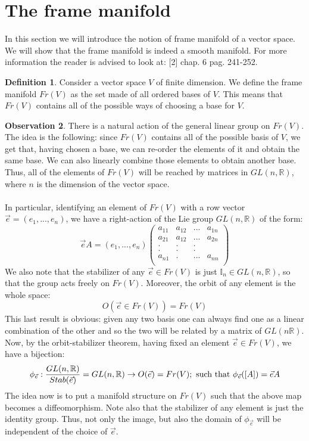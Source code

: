 \documentclass[12pt,a4paper]{report}
\theoremstyle{definition}
\newtheorem{Def}{Definition}[chapter]
\theoremstyle{Theorem}
\theoremstyle{definition}
\theoremstyle{definition}
\newtheorem{Obs}[Def]{Observation}
\begin{document}
	\section{The frame manifold}
	In this section we will introduce the notion of frame manifold of a vector space. We will show that the frame manifold is indeed a smooth manifold. For more information the reader is advised to look at: [2] chap. 6 pag. 241-252.
	\begin{Def}\label{Def_6.5}
		Consider a vector space $V$ of finite dimension. We define the frame manifold $Fr(V)$ as the set made of all ordered bases of $V$. This means that $Fr(V)$ contains all of the possible ways of choosing a base for $V$.
	\end{Def}
	\begin{Obs}
		There is a natural action of the general linear group on $Fr(V)$. The idea is the following: since $Fr(V)$ contains all of the possible basis of $V$, we get that, having chosen a base, we can re-order the elements of it and obtain the same base. We can also linearly combine those elements to obtain another base. Thus, all of the elements of $Fr(V)$ will be reached by matrices in $GL(n,\mathbb{R})$, where $n$ is the dimension of the vector space.\\
		\\
		In particular, identifying an element of $Fr(V)$ with a row vector $\vec{e}=(e_1,...,e_n)$, we have a right-action of the Lie group $GL(n,\mathbb{R})$ of the form:
		$$\vec{e}A=(e_1,...,e_n)\begin{pmatrix}
			a_{11}&a_{12}&...&a_{1n}\\
			a_{21}&a_{12}&...&a_{2n}\\
			.     &.     &.   &     \\
			.     &.     &.   &     \\
			a_{n1}&.     &...&a_{nn}\\
		\end{pmatrix}$$
		We also note that the stabilizer of any $\vec{e}\in Fr(V)$ is just $\mathbb{I}_n\in GL(n,\mathbb{R})$, so that the group acts freely on $Fr(V)$. Moreover, the orbit of any element is the whole space: 
		$$O(\vec{e}\in Fr(V))=Fr(V)$$
		This last result is obvious: given any two basis one can always find one as a linear combination of the other and so the two will be related by a matrix of $GL(n\mathbb{R})$.
		Now, by the orbit-stabilizer theorem, having fixed an element $\vec{e}\in Fr(V)$, we have a bijection:
		$$\phi_{\vec{e}}:{GL(n,\mathbb{R})\over Stab(\vec{e})}=GL(n,\mathbb{R})\rightarrow O(\vec{e})=Fr(V);\hbox{ such that } \phi_{\vec{e}}([A])=\vec{e}A$$
		The idea now is to put a manifold structure on $Fr(V)$ such that the above map becomes a diffeomorphism. Note also that the stabilizer of any element is just the identity group. Thus, not only the image, but also the domain of $\phi_{\vec{e}}$ will be independent of the choice of $\vec{e}$.
	\end{Obs}
\end{document}
